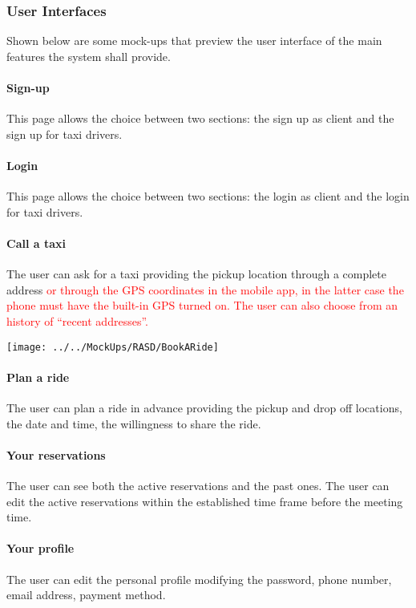 \documentclass[a4paper,11pt]{report} %
\begin{document}
	\subsubsection{User Interfaces} Shown below are some mock-ups that preview the user interface of the main features the system shall provide.
	
	\paragraph{Sign-up} This page allows the choice between two sections: the sign up as client and the sign up for taxi drivers.
	
	\paragraph{Login} This page allows the choice between two sections: the login as client and the login for taxi drivers.
	
	\pagebreak
	
	\paragraph{Call a taxi} The user can ask for a taxi providing the pickup location through a complete address \textcolor{red}{or through the GPS coordinates in the mobile app, in the latter case the phone must have the built-in GPS turned on. The user can also choose from an history of ``recent addresses''.}
	\begin{center}
		\texttt{[image: ../../MockUps/RASD/BookARide]}
	\end{center}
	
	\pagebreak
	
	\paragraph{Plan a ride} The user can plan a ride in advance providing the pickup and drop off locations, the date and time, the willingness to share the ride.
	
	\paragraph{Your reservations} The user can see both the active reservations and the past ones. The user can edit the active reservations within the established time frame before the meeting time.
	
	\paragraph{Your profile} The user can edit the personal profile modifying the password, phone number, email address, payment method.
	
\end{document}
